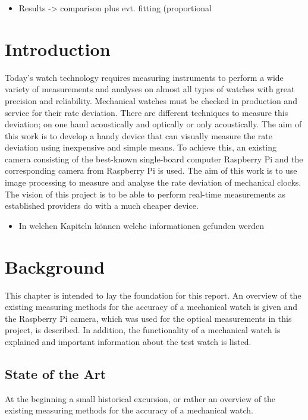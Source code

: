 \documentclass[12pt, a4paper]{report}
\begin{document}
\begin{itemize}
\item Results -> comparison plus evt. fitting (proportional 
\end{itemize}

\pagebreak
    \setcounter{secnumdepth}{5} 
    \setcounter{tocdepth}{5} 
    \tableofcontents
    \pagebreak
    
    \chapter{Introduction}
    Today's watch technology requires measuring instruments to perform a wide variety of measurements and analyses on almost all types of watches with great precision and reliability.
    Mechanical watches must be checked in production and service for their rate deviation.
    There are different techniques to measure this deviation; on one hand acoustically and optically or only acoustically.
    The aim of this work is to develop a handy device that can visually measure the rate deviation using inexpensive and simple means.
    To achieve this, an existing camera consisting of the best-known single-board computer Raspberry Pi and the corresponding camera from Raspberry Pi is used.
    The aim of this work is to use image processing to measure and analyse the rate deviation of mechanical clocks.
    The vision of this project is to be able to perform real-time measurements as established providers do with a much cheaper device.
    
   \begin{itemize}
\item In welchen Kapiteln können welche informationen gefunden werden
\end{itemize}
    
    \chapter{Background}
    This chapter is intended to lay the foundation for this report. An overview of the existing measuring methods for the accuracy of a mechanical watch is given and the Raspberry Pi camera, which was used for the optical measurements in this project, is described. In addition, the functionality of a mechanical watch is explained and important information about the test watch is listed.
    \section{State of the Art}
    At the beginning a small historical excursion, or rather an overview of the existing measuring methods for the accuracy of a mechanical watch.
\end{document}
